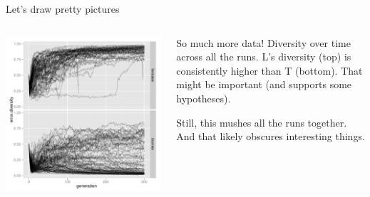 \documentclass{beamer}
\newcommand{\linespace}{\vskip 0.25cm}
\begin{document}
\begin{frame}{Let's draw pretty pictures}
	
	\begin{columns}
		\begin{column}{0.55 \linewidth}
			\centering
			\includegraphics[width = \linewidth]{Figures/rswn_diversity.pdf}
		\end{column}
		
		\begin{column}{0.4 \linewidth}
			\begin{overprint}
				So much more data!
				\linespace
				Diversity over time across all the runs.
				\linespace
				L's diversity (top) is consistently higher than T (bottom).
				\linespace
				That might be important (and supports some hypotheses).
				
				Still, this mushes all the runs together.
				\linespace
				And that likely obscures interesting things.
			\end{overprint}
		\end{column}
	\end{columns}
\end{frame}
\end{document}

